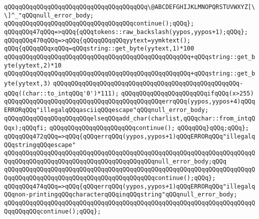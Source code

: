 \verb|qQQqqQQqqQQqqQQqqQQqqQQqqQQqqQQqqQQqqQQq\@ABCDEFGHIJKLMNOPQRSTUVWXYZ[\\]^_"qQQqnull_error_body;|\newline
\verb|qQQqqQQqqQQqqQQqqQQqqQQqqQQqqQQqqQQqcontinue();qQQq};|\newline
\verb|qQQqqQQq47qQQq=>qQQq{qQQqtokens::raw_backslash(yypos,yypos+1);qQQq};|\newline
\verb|qQQqqQQq470qQQq=>qQQq{qQQqqQQqqQQqyytext=yymktext();|\newline
\verb|qQQq{qQQqqQQqxqQQq=qQQqstring::get_byte(yytext,1)*100|\newline
\verb|qQQqqQQqqQQqqQQqqQQqqQQqqQQqqQQqqQQqqQQqqQQqqQQqqQQq+qQQqstring::get_byte(yytext,2)*10|\newline
\verb|qQQqqQQqqQQqqQQqqQQqqQQqqQQqqQQqqQQqqQQqqQQqqQQqqQQq+qQQqstring::get_byte(yytext,3)|\newline
\verb|qQQqqQQqqQQqqQQqqQQqqQQqqQQqqQQqqQQqqQQqqQQqqQQqqQQq-qQQq((char::to_intqQQq'0')*111);|\newline
\verb|qQQqqQQqqQQqqQQqqQQqqQQqifqQQq(x>255)|\newline
\verb|qQQqqQQqqQQqqQQqqQQqqQQqqQQqqQQqqQQqqQQqqQQqerrqQQq(yypos,yypos+4)qQQqERRORqQQq"illegalqQQqasciiqQQqescape"qQQqnull_error_body;|\newline
\verb|qQQqqQQqqQQqqQQqqQQqqQQqelseqQQqadd_char(charlist,qQQqchar::from_intqQQqx);qQQqfi;|\newline
\newline
\verb|qQQqqQQqqQQqqQQqqQQqqQQqcontinue();|\newline
\newline
\verb|qQQqqQQq}qQQq;qQQq};|\newline
\verb|qQQqqQQq472qQQq=>qQQq{qQQqerrqQQq(yypos,yypos+1)qQQqERRORqQQq"illegalqQQqstringqQQqescape"|\newline
\verb|qQQqqQQqqQQqqQQqqQQqqQQqqQQqqQQqqQQqqQQqqQQqqQQqqQQqqQQqqQQqqQQqqQQqqQQqqQQqqQQqqQQqqQQqqQQqqQQqqQQqqQQqqQQqqQQqnull_error_body;qQQq|\newline
\verb|qQQqqQQqqQQqqQQqqQQqqQQqqQQqqQQqqQQqqQQqqQQqqQQqqQQqqQQqqQQqqQQqqQQqqQQqqQQqqQQqqQQqqQQqqQQqqQQqqQQqqQQqqQQqqQQqcontinue();qQQq};|\newline
\verb|qQQqqQQq474qQQq=>qQQq{qQQqerrqQQq(yypos,yypos+1)qQQqERRORqQQq"illegalqQQqnon-printingqQQqcharacterqQQqinqQQqstring"qQQqnull_error_body;|\newline
\verb|qQQqqQQqqQQqqQQqqQQqqQQqqQQqqQQqqQQqqQQqqQQqqQQqqQQqqQQqqQQqqQQqqQQqqQQqqQQqqQQqcontinue();qQQq};|\newline
